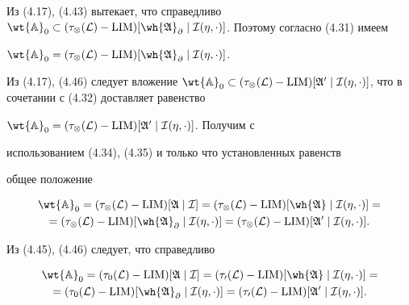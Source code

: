 Из (4.17), (4.43) вытекает, что справедливо $\wt{\Bbb A}_0\subset


(\tau_\otimes(\cal L)-\LIM)[\wh{\frak A}_\partial\mid


\cal I(\eta,\cdot)]$. Поэтому согласно (4.31) имеем


$\wt{\Bbb A}_0=(\tau_\otimes(\cal L)-


\LIM)[\wh{\frak A}_\partial\mid\cal I(\eta,\cdot)]$.


Из (4.17), (4.46) следует вложение $\wt{\Bbb A}_0\subset


(\tau_\otimes(\cal L)-\LIM)[\frak A^0\mid\cal I(\eta,


\cdot)]$, что в сочетании с (4.32) доставляет равенство


$\wt{\Bbb A}_0=(\tau_\otimes(\cal L)-


\LIM)[\frak A^0\mid\cal I(\eta,\cdot)]$. Получим с


использованием (4.34), (4.35) и только что установленных равенств


общее положение


\begin{multline}


\wt{\Bbb A}_0=(\tau_\otimes(\cal L)-


\LIM)[\frak A\mid\cal I]=(\tau_\otimes(\cal L)-


\LIM)[\wh{\frak A}\mid\cal I(\eta,\cdot)]=\\


=(\tau_\otimes(\cal L)-\LIM)[


\wh{\frak A}_\partial\mid\cal I(\eta,\cdot)]=


(\tau_\otimes(\cal L)-\LIM)[\frak A^0\mid\cal I(\eta,\cdot)].


\end{multline}


Из (4.45), (4.46) следует, что справедливо


\begin{multline}


\wt{\Bbb A}_0=(\tau_0(\cal L)-\LIM)[


\frak A\mid\cal I]=(\tau_0(\cal L)-\LIM)[


\wh{\frak A}\mid\cal I(\eta,\cdot)]=\\


=(\tau_0(\cal L)-\LIM)[\wh{\frak A}_\partial


\mid\cal I(\eta,\cdot)]=(\tau_0(\cal L)-


\LIM)[\frak A^0\mid\cal I(\eta,\cdot)].


\end{multline}



